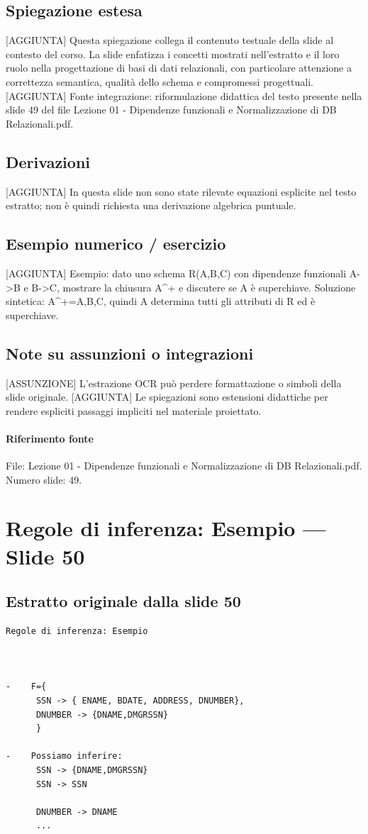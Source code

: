 \documentclass[11pt]{article}
\begin{document}
\subsection*{Spiegazione estesa}
[AGGIUNTA] Questa spiegazione collega il contenuto testuale della slide al contesto del corso. La slide enfatizza i concetti mostrati nell'estratto e il loro ruolo nella progettazione di basi di dati relazionali, con particolare attenzione a correttezza semantica, qualità dello schema e compromessi progettuali.
[AGGIUNTA] Fonte integrazione: riformulazione didattica del testo presente nella slide 49 del file Lezione 01 - Dipendenze funzionali e Normalizzazione di DB Relazionali.pdf.
\subsection*{Derivazioni}
[AGGIUNTA] In questa slide non sono state rilevate equazioni esplicite nel testo estratto; non è quindi richiesta una derivazione algebrica puntuale.
\subsection*{Esempio numerico / esercizio}
[AGGIUNTA] Esempio: dato uno schema R(A,B,C) con dipendenze funzionali A->B e B->C, mostrare la chiusura A^+ e discutere se A è superchiave. Soluzione sintetica: A^+={A,B,C}, quindi A determina tutti gli attributi di R ed è superchiave.
\subsection*{Note su assunzioni o integrazioni}
[ASSUNZIONE] L'estrazione OCR può perdere formattazione o simboli della slide originale.
[AGGIUNTA] Le spiegazioni sono estensioni didattiche per rendere espliciti passaggi impliciti nel materiale proiettato.
\paragraph{Riferimento fonte} File: Lezione 01 - Dipendenze funzionali e Normalizzazione di DB Relazionali.pdf. Numero slide: 49.
\section{Regole di inferenza: Esempio --- Slide 50}
\subsection*{Estratto originale dalla slide 50}
\begin{lstlisting}
Regole di inferenza: Esempio



-    F={
      SSN -> { ENAME, BDATE, ADDRESS, DNUMBER},
      DNUMBER -> {DNAME,DMGRSSN}
      }

-    Possiamo inferire:
      SSN -> {DNAME,DMGRSSN}
      SSN -> SSN

      DNUMBER -> DNAME
      ...
\end{lstlisting}
\end{document}

